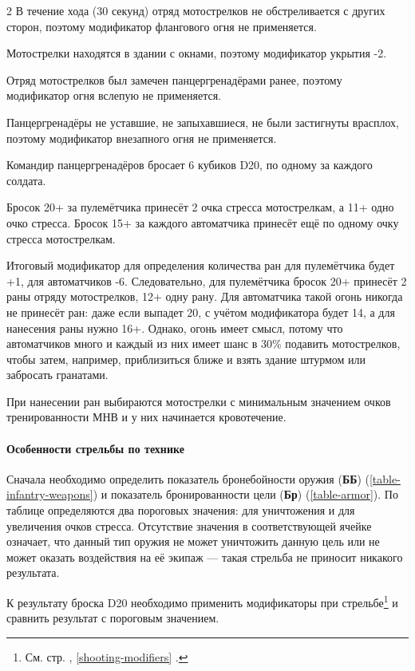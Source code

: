 \documentclass[twoside]{article}
\begin{document}
\begin{multicols}{2}
В течение хода (30 секунд) отряд мотострелков не обстреливается
с других сторон, поэтому модификатор флангового огня не применяется.

Мотострелки находятся в здании с окнами, поэтому модификатор укрытия -2.

Отряд мотострелков был замечен панцергренадёрами ранее, поэтому
модификатор огня вслепую не применяется.

Панцергренадёры не уставшие, не запыхавшиеся, не были застигнуты
врасплох, поэтому модификатор внезапного огня не применяется.

Командир панцергренадёров бросает 6 кубиков D20, по одному за каждого
солдата.

Бросок 20+ за пулемётчика принесёт 2 очка стресса мотострелкам, а 11+
одно очко стресса. Бросок 15+ за каждого автоматчика принесёт ещё по
одному очку стресса мотострелкам.

Итоговый модификатор для определения количества ран для пулемётчика
будет +1, для автоматчиков -6. Следовательно, для пулемётчика бросок 20+
принесёт 2 раны отряду мотострелков, 12+ одну рану. Для автоматчика
такой огонь никогда не принесёт ран: даже если выпадет 20, с учётом
модификатора будет 14, а для нанесения раны нужно 16+. Однако, огонь
имеет смысл, потому что автоматчиков много и каждый из них имеет шанс в
30\% подавить мотострелков, чтобы затем, например, приблизиться ближе и
взять здание штурмом или забросать гранатами.

При нанесении ран выбираются мотострелки с минимальным значением очков
тренированности МНВ и у них начинается кровотечение.

\paragraph{Особенности стрельбы по технике}\label{vehicle-shooting}

Сначала необходимо определить показатель бронебойности оружия
(\textbf{ББ}) (\autoref{table-infantry-weapons}) и показатель бронированности цели
(\textbf{Бр}) (\autoref{table-armor}). По таблице определяются два пороговых значения: для уничтожения и
для увеличения очков стресса. Отсутствие значения в соответствующей
ячейке означает, что данный тип оружия не может уничтожить данную цель
или не может оказать воздействия на её экипаж --- такая стрельба не
приносит никакого результата.

К результату броска D20 необходимо применить модификаторы при
стрельбе\footnote{См. стр. \pageref{shooting-modifiers}, \ref{shooting-modifiers} .} и сравнить результат с пороговым
значением.


\end{multicols}
\end{document}
